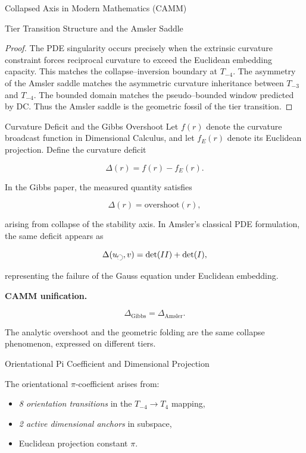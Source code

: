 \documentclass[final,onefignum,onetabnum]{siamart}
\begin{document}
\begin{section}{Collapsed Axis in Modern Mathematics (CAMM)}
\begin{subsection}{Tier Transition Structure and the Amsler Saddle}
\begin{proof}
The PDE singularity occurs precisely when the extrinsic curvature constraint forces reciprocal curvature to exceed the Euclidean embedding capacity. This matches the collapse–inversion boundary at $T_{-4}$. The asymmetry of the Amsler saddle matches the asymmetric curvature inheritance between $T_{-3}$ and $T_{-4}$. The bounded domain matches the pseudo–bounded window predicted by DC. Thus the Amsler saddle is the geometric fossil of the tier transition.
\end{proof}
\end{subsection}

\begin{subsection}{Curvature Deficit and the Gibbs Overshoot}
Let $f(r)$ denote the curvature broadcast function in Dimensional Calculus, and let $f_{E}(r)$ denote its Euclidean projection. Define the curvature deficit


\[
\Delta(r) = f(r) - f_{E}(r).
\]


In the Gibbs paper, the measured quantity satisfies


\[
\Delta(r) = \text{overshoot}(r),
\]


arising from collapse of the stability axis.
In Amsler’s classical PDE formulation, the same deficit appears as


\[
\Delta(u_{\scriptscriptstyle \mathbin{\rotatebox[origin=c]{90}{$\circlearrowleft$}}}, v) = \det(II) + \det(I),
\]


representing the failure of the Gauss equation under Euclidean embedding.

\medskip
\noindent\textbf{CAMM unification.}


\[
\Delta_{\text{Gibbs}} = \Delta_{\text{Amsler}}.
\]


The analytic overshoot and the geometric folding are the same collapse phenomenon, expressed on different tiers.
\end{subsection}

\begin{subsection}{Orientational Pi Coefficient and Dimensional Projection}

The orientational $\pi$-coefficient arises from:

\begin{itemize}
    \item \textit{8 orientation transitions} in the $T_{-4} \rightarrow T_4$ mapping,
    \item \textit{2 active dimensional anchors} in subspace,
    \item Euclidean projection constant \textit{$\pi$}.
\end{itemize}


\end{subsection}
\end{section}
\end{document}
